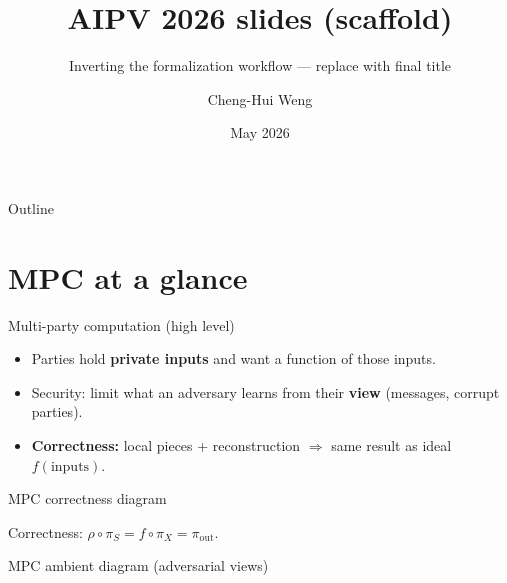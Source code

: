 \documentclass[10pt,aspectratio=169]{beamer}
\title{AIPV 2026 slides (scaffold)}
\subtitle{Inverting the formalization workflow — replace with final title}
\author{Cheng-Hui Weng}
\institute{Nagoya University}
\date{May 2026}
\begin{document}
\begin{frame}
  \titlepage
\end{frame}

\begin{frame}{Outline}
  \tableofcontents
\end{frame}

\section{MPC at a glance}

\begin{frame}{Multi-party computation (high level)}
  \begin{itemize}
    \item Parties hold \textbf{private inputs} and want a function of those inputs.
    \item Security: limit what an adversary learns from their \textbf{view} (messages, corrupt parties).
    \item \textbf{Correctness:} local pieces + reconstruction $\Rightarrow$ same result as ideal $f(\text{inputs})$.
  \end{itemize}
\end{frame}

\begin{frame}[fragile]{MPC correctness diagram}
  \centering
  \vspace{0.6em}

  {\small Correctness: $\rho \circ \pi_S = f \circ \pi_X = \pi_{\mathrm{out}}$.}
\end{frame}

\begin{frame}[fragile]{MPC ambient diagram (adversarial views)}
  \centering
\end{frame}
\end{document}
